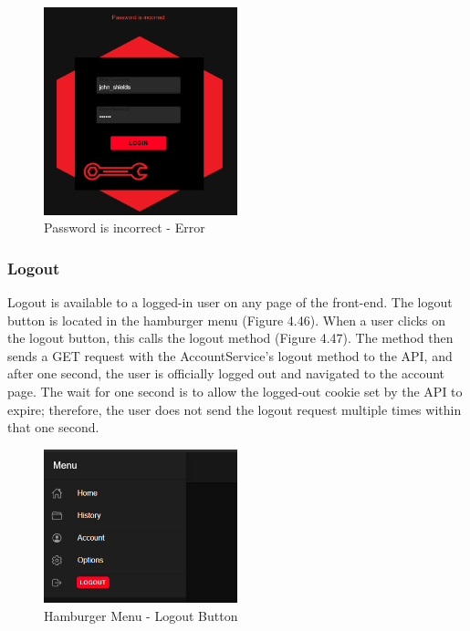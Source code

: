 \begin{figure}[H]
    \caption{Password is incorrect - Error}
    \label{image:failedLogin}
    \centering
    \includegraphics[width=0.5\textwidth]{images/repota/UI/failed-login.png}
\end{figure}

\subsubsection{Logout}
Logout is available to a logged-in user on any page of the front-end. The logout button is located in the hamburger menu (Figure 4.46). When a user clicks on the logout button, this calls the logout method (Figure 4.47). The method then sends a GET request with the AccountService's logout method to the API, and after one second, the user is officially logged out and navigated to the account page. The wait for one second is to allow the logged-out cookie set by the API to expire; therefore, the user does not send the logout request multiple times within that one second.

\begin{figure}[H]
    \caption{Hamburger Menu - Logout Button}
    \label{image:logoutButton}
    \centering
    \includegraphics[width=0.5\textwidth]{images/repota/UI/logout.png}
\end{figure}

